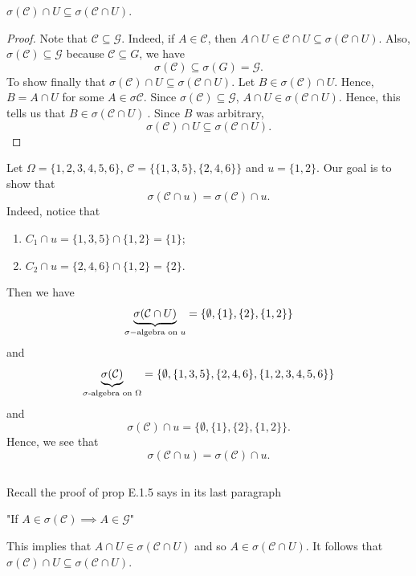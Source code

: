\begin{prop}
    \( \sigma(\mathcal{C}) \cap U \subseteq  \sigma(\mathcal{C} \cap U). \) 
\end{prop}
\begin{proof}
Note that \( \mathcal{C} \subseteq  \mathcal{G} \). Indeed, if \( A \in \mathcal{C} \), then \( A \cap U \in \mathcal{C} \cap U \subseteq  \sigma(\mathcal{C} \cap U)\). Also, \( \sigma(\mathcal{C}) \subseteq \mathcal{G}   \) because \( \mathcal{C} \subseteq  G  \), we have 
\[  \sigma(\mathcal{C}) \subseteq  \sigma(G) = \mathcal{G}.  \]
To show finally that \( \sigma(\mathcal{C}) \cap U \subseteq  \sigma(\mathcal{C} \cap U) \). Let \( B \in \sigma(\mathcal{C}) \cap U  \). Hence, \( B = A \cap U  \) for some \( A \in \sigma{\mathcal{C}} \). Since \( \sigma(\mathcal{C}) \subseteq  \mathcal{G} \), \( A \cap U \in \sigma(\mathcal{C} \cap U) \). Hence, this tells us that \( B \in \sigma(\mathcal{C} \cap U) \ \). Since \( B  \) was arbitrary,
\[  \sigma(\mathcal{C}) \cap U  \subseteq  \sigma(\mathcal{C} \cap U). \]
\end{proof}

\begin{eg}
    Let \( \Omega = \{  1,2,3,4,5,6 \}  \), \( \mathcal{C} = \{  \{  1,3,5 \} , \{ 2,4,6 \}  \}   \) and \( u = \{  1,2 \}  \). Our goal is to show that 
    \[  \sigma(\mathcal{C}\cap u) = \sigma(\mathcal{C}) \cap u. \]
    Indeed, notice that 
    \begin{enumerate}
        \item[(1)] \( {C}_{1} \cap u  = \{  1,3,5 \} \cap \{ 1,2 \}  = \{ 1 \}  \);
        \item[(2)] \( {C}_{2} \cap u = \{ 2,4,6 \}  \cap \{ 1,2 \}  = \{ 2 \}  \).
    \end{enumerate}
    Then we have 
    \[  \underbrace{\sigma(\mathcal{C} \cap U)}_{\text{\( \sigma- \)algebra on \( u \)}} = \{  \emptyset , \{ 1 \} , \{ 2 \} , \{ 1,2 \}  \}  \]
    and
    \[ \underbrace{\sigma(\mathcal{C})}_{\text{\( \sigma \)-algebra on \( \Omega \)}} = \{  \emptyset , \{ 1,3,5 \} , \{ 2,4,6 \} , \{ 1,2,3,4,5,6 \}  \}    \]
    and 
    \[  \sigma(\mathcal{C}) \cap u = \{  \emptyset , \{ 1 \} , \{ 2 \} , \{ 1,2 \}  \}. \]
    Hence, we see that 
    \[  \sigma(\mathcal{C} \cap u ) = \sigma(\mathcal{C}) \cap u. \]

    \[   \]
\end{eg}


Recall the proof of prop E.1.5 says in its last paragraph 
\begin{center}
    "If \( A \in \sigma(\mathcal{C}) \implies A \in \mathcal{G} \)"
\end{center}
This implies that \( A \cap U \in \sigma(\mathcal{C} \cap U) \) and so \( A \in \sigma(\mathcal{C} \cap U) \). It follows that \( \sigma(\mathcal{C}) \cap U \subseteq  \sigma(\mathcal{C} \cap U) \). 

